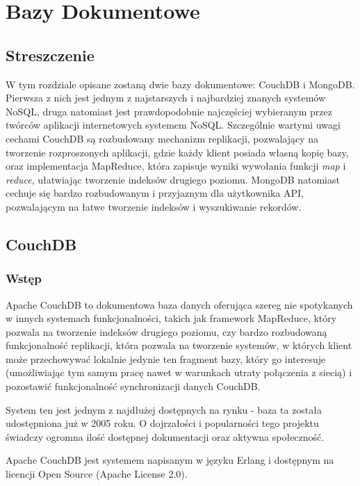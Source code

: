 \chapter{Bazy Dokumentowe}

\section*{Streszczenie}
W tym rozdziale opisane zostaną dwie bazy dokumentowe: CouchDB i MongoDB.
Pierwsza z nich jest jednym z najstarszych i najbardziej znanych systemów NoSQL, druga natomiast jest prawdopodobnie najczęściej wybieranym przez twórców aplikacji internetowych systemem NoSQL.
Szczególnie wartymi uwagi cechami CouchDB są rozbudowany mechanizm replikacji, pozwalający na tworzenie rozproszonych aplikacji, gdzie każdy klient posiada własną kopię bazy, oraz implementacja MapReduce, która zapisuje wyniki wywołania funkcji \emph{map} i \emph{reduce}, ułatwiając tworzenie indeksów drugiego poziomu.
MongoDB natomiast cechuje się bardzo rozbudowanym i przyjaznym dla użytkownika API, pozwalającym na łatwe tworzenie indeksów i wyszukiwanie rekordów.

\section{CouchDB}
\label{sec:couchdb}

\subsection*{Wstęp}

Apache CouchDB to dokumentowa baza danych oferująca szereg nie spotykanych w innych systemach funkcjonalności, takich jak framework MapReduce, który pozwala na tworzenie indeksów drugiego poziomu, czy bardzo rozbudowaną funkcjonalność replikacji, która pozwala na tworzenie systemów, w których klient może przechowywać lokalnie jedynie ten fragment bazy, który go interesuje (umożliwiając tym samym pracę nawet w warunkach utraty połączenia z siecią) i pozostawić funkcjonalność synchronizacji danych CouchDB.

System ten jest jednym z najdłużej dostępnych na rynku - baza ta została udostępniona już w 2005 roku.
O dojrzałości i popularności tego projektu świadczy ogromna ilość dostępnej dokumentacji oraz aktywna społeczność.

Apache CouchDB jest systemem napisanym w języku Erlang i dostępnym na licencji Open Source (Apache License 2.0).

